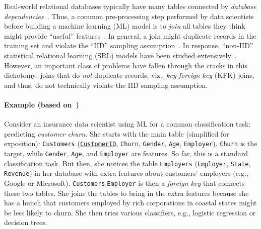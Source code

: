 Real-world relational databases typically have many tables connected by \textit{database dependencies}~\cite{cowbook}. Thus, a common pre-processing step 
performed by data scientists before building a machine learning (ML) model is to \textit{join} all tables they think might provide 
``useful'' features~\cite{crossmine,orion,rendle,hamlet,olteanuf}.
In general, a join might duplicate records in the training set and violate the ``IID'' sampling assumption~\cite{hastie}. 
In response, ``non-IID'' statistical relational learning (SRL) models have been studied extensively~\cite{srlbook}. 
However, an important class of problems have fallen through the cracks in this dichotomy: 
joins that do \textit{not} duplicate records, viz., \textit{key-foreign key} (KFK) joins, and thus, do not technically violate the IID sampling assumption.

\paragraph*{Example (based on~\cite{orion})}
Consider an insurance data scientist using ML for a common classification task: predicting \textit{customer churn}. She starts with the main table (simplified 
for exposition): \texttt{Customers} (\underline{\texttt{CustomerID}}, \texttt{Churn}, \texttt{Gender}, \texttt{Age}, \texttt{Employer}). 
\texttt{Churn} is the target, while \texttt{Gender}, \texttt{Age}, and \texttt{Employer} are features. So far, this is a standard classification task.  
But then, she notices the table \texttt{Employers} (\underline{\texttt{Employer}}, \texttt{State}, \texttt{Revenue}) in her database with extra features about 
customers' employers (e.g., Google or Microsoft). \texttt{Customers}.\texttt{Employer} is then a \textit{foreign key} that connects these two tables. 
She joins the tables to bring in the extra features because she has a hunch that customers employed by rich corporations in coastal states might be less likely 
to churn. She then tries various classifiers, e.g., logistic regression or decision trees.

